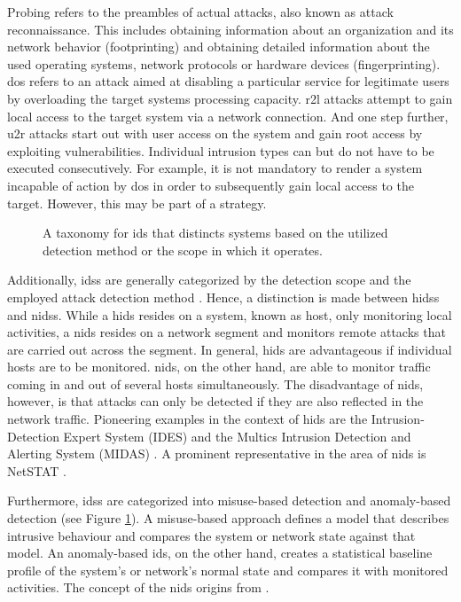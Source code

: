 \documentclass[../../../main.tex]{subfiles}
\begin{document}
Probing refers to the preambles of actual attacks, also known as attack reconnaissance. This includes obtaining information about an organization and its network behavior (footprinting) and obtaining detailed information about the used operating systems, network protocols or hardware devices (fingerprinting). 
\newpage
\gls{dos} refers to an attack aimed at disabling a particular service for legitimate users by overloading the target systems processing capacity. \gls{r2l} attacks attempt to gain local access to the target system via a network connection. And one step further, \gls{u2r} attacks start out with user access on the system and gain root access by exploiting vulnerabilities. Individual intrusion types can but do not have to be executed consecutively. For example, it is not mandatory to render a system incapable of action by \gls{dos} in order to subsequently gain local access to the target. However, this may be part of a strategy.

\begin{figure}[b]
    \centering
    
    \caption[\gls{ids} taxonomy]{A taxonomy for \gls{ids} that distincts systems based on the utilized detection method or the  scope in which it operates.}
    \label{fig:ids-taxonomy}
\end{figure}

Additionally, \glspl{ids} are generally categorized by the detection scope and the employed attack detection method \cite{milenkoski2015evaluating}. Hence, a distinction is made between \glspl{hids} and \glspl{nids}. While a \gls{hids} resides on a system, known as host, only monitoring local activities, a \gls{nids} resides on a network segment and monitors remote attacks that are carried out across the segment. In general, \gls{hids} are advantageous if individual hosts are to be monitored. \gls{nids}, on the other hand, are able to monitor traffic coming in and out of several hosts simultaneously. The disadvantage of \gls{nids}, however, is that attacks can only be detected if they are also reflected in the network traffic. Pioneering examples in the context of \gls{hids} are the Intrusion-Detection Expert System (IDES) \cite{lunt1992real} and the Multics Intrusion Detection and Alerting System (MIDAS) \cite{sebring1988expert}. A prominent representative in the area of \gls{nids} is NetSTAT \cite{vigna1998netstat} \cite{vigna1999netstat}.

Furthermore, \glspl{ids} are categorized into misuse-based detection and anomaly-based detection (see Figure \ref{fig:ids-taxonomy}). A misuse-based approach defines a model that describes intrusive behaviour and compares the system or network state against that model. An anomaly-based \gls{ids}, on the other hand, creates a statistical baseline profile of the system’s or network’s normal state and compares it with monitored activities. The concept of the \gls{nids} origins from \cite{denning1987intrusion}. 
\end{document}

